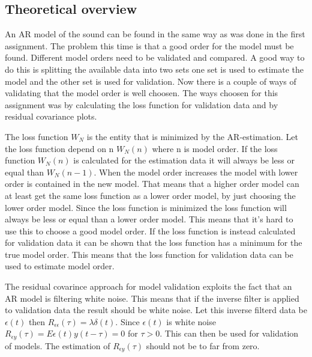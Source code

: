 \documentclass[12pt]{article}
\begin{document}
\subsection{Theoretical overview}
An AR model of the sound can be found in the same way as was done in the first assignment.
The problem this time is that a good order for the model must be found.
Different model orders need to be validated and compared.
A good way to do this is splitting the available data into two sets one set is used to estimate the model and the other set is used for validation.
Now there is a couple of ways of validating that the model order is well choosen.
The ways choosen for this assignment was by calculating the loss function for validation data and by residual covariance plots.

The loss function $W_N$ is the entity that is minimized by the AR-estimation.
Let the loss function depend on n $W_N(n)$ where n is model order.
If the loss function $W_N(n)$ is calculated for the estimation data it will always be less or equal than $W_N(n-1)$.
When the model order increases the model with lower order is contained in the new model.
That means that a higher order model can at least get the same loss function as a lower order model, by just choosing the lower order model.
Since the loss function is minimized the loss function will always be less or equal than a lower order model.
This means that it's hard to use this to choose a good model order.
If the loss function is instead calculated for validation data it can be shown that the loss function has a minimum for the true model order.
This means that the loss function for validation data can be used to estimate model order.

The residual covarince approach for model validation exploits the fact that an AR model is filtering white noise.
This means that if the inverse filter is applied to validation data the result should be white noise.
Let this inverse filterd data be $\epsilon(t)$ then $R_{\epsilon \epsilon}(\tau) = \lambda\delta(t)$.
Since $\epsilon(t)$ is white noise $R_{\epsilon y}(\tau) = E\epsilon(t) y(t-\tau) = 0$ for $\tau > 0$.
This can then be used for validation of models.
The estimation of $R_{\epsilon y}(\tau)$ should not be to far from zero.
\end{document}
